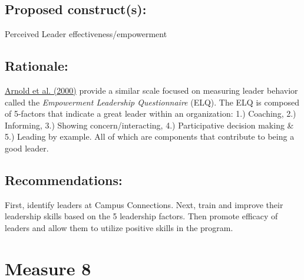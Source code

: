 \documentclass[]{article}
\begin{document}
\subsection{\texorpdfstring{\textbf{Proposed
construct(s)}:}{Proposed construct(s):}}\label{proposed-constructs-6}

Perceived Leader effectiveness/empowerment

\subsection{\texorpdfstring{\textbf{Rationale}:}{Rationale:}}\label{rationale-6}

\href{https://onlinelibrary.wiley.com/doi/epdf/10.1002/\%28SICI\%291099-1379\%28200005\%2921\%3A3\%3C249\%3A\%3AAID-JOB10\%3E3.0.CO\%3B2-\%23}{Arnold
et al. (2000)} provide a similar scale focused on measuring leader
behavior called the \emph{Empowerment Leadership Questionnaire} (ELQ).
The ELQ is composed of 5-factors that indicate a great leader within an
organization: 1.) Coaching, 2.) Informing, 3.) Showing
concern/interacting, 4.) Participative decision making \& 5.) Leading by
example. All of which are components that contribute to being a good
leader.

\subsection{\texorpdfstring{\textbf{Recommendations}:}{Recommendations:}}\label{recommendations-6}

First, identify leaders at Campus Connections. Next, train and improve
their leadership skills based on the 5 leadership factors. Then promote
efficacy of leaders and allow them to utilize positive skills in the
program.

\section{Measure 8}\label{measure-8}
\end{document}
